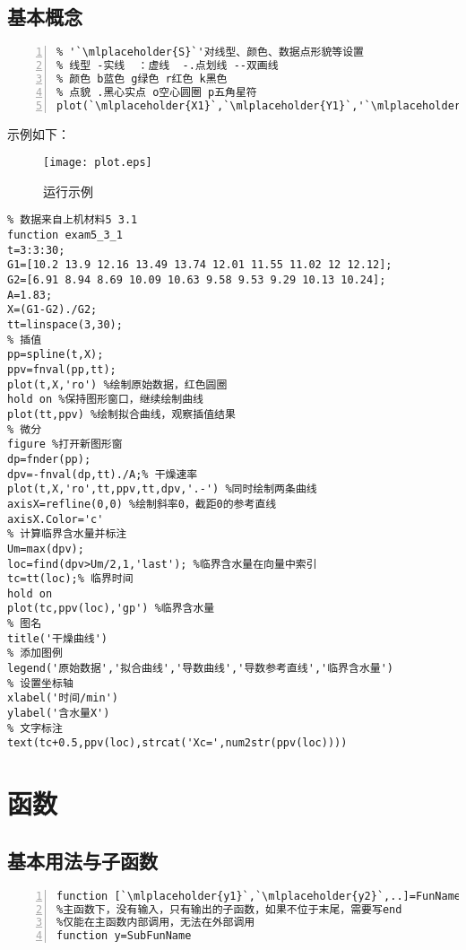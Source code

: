 \subsection{基本概念}
\begin{lstlisting}[frame=single,numbers=left]
% 可将多条曲线绘制于同一图形窗口
% '`\mlplaceholder{S}`'对线型、颜色、数据点形貌等设置
% 线型 -实线  ：虚线  -.点划线 --双画线
% 颜色 b蓝色 g绿色 r红色 k黑色
% 点貌 .黑心实点 o空心圆圈 p五角星符
plot(`\mlplaceholder{X1}`,`\mlplaceholder{Y1}`,'`\mlplaceholder{S1}`',`\mlplaceholder{X2}`,`\mlplaceholder{Y2}`,'`\mlplaceholder{S2}`',…）
\end{lstlisting}
示例如下：
\begin{figure}[htbp]
	\centering
	\texttt{[image: plot.eps]}
	\caption{运行示例}
\end{figure}
\newpage
\begin{lstlisting}
% 数据来自上机材料5 3.1
function exam5_3_1
t=3:3:30;
G1=[10.2 13.9 12.16 13.49 13.74 12.01 11.55 11.02 12 12.12];
G2=[6.91 8.94 8.69 10.09 10.63 9.58 9.53 9.29 10.13 10.24];
A=1.83;
X=(G1-G2)./G2;
tt=linspace(3,30);
% 插值
pp=spline(t,X);
ppv=fnval(pp,tt);
plot(t,X,'ro') %绘制原始数据，红色圆圈
hold on %保持图形窗口，继续绘制曲线
plot(tt,ppv) %绘制拟合曲线，观察插值结果
% 微分
figure %打开新图形窗
dp=fnder(pp);
dpv=-fnval(dp,tt)./A;% 干燥速率
plot(t,X,'ro',tt,ppv,tt,dpv,'.-') %同时绘制两条曲线
axisX=refline(0,0) %绘制斜率0，截距0的参考直线
axisX.Color='c'
% 计算临界含水量并标注
Um=max(dpv);
loc=find(dpv>Um/2,1,'last'); %临界含水量在向量中索引
tc=tt(loc);% 临界时间
hold on
plot(tc,ppv(loc),'gp') %临界含水量
% 图名
title('干燥曲线')
% 添加图例
legend('原始数据','拟合曲线','导数曲线','导数参考直线','临界含水量')
% 设置坐标轴
xlabel('时间/min')
ylabel('含水量X')
% 文字标注
text(tc+0.5,ppv(loc),strcat('Xc=',num2str(ppv(loc))))
\end{lstlisting}
\section{函数}
\subsection{基本用法与子函数}
\begin{lstlisting}[frame=single,numbers=left]
% 注意：[]与()的使用
function [`\mlplaceholder{y1}`,`\mlplaceholder{y2}`,..]=FunName(`\mlplaceholder{x1}`,`\mlplaceholder{x2}`,..)
%主函数下，没有输入，只有输出的子函数，如果不位于末尾，需要写end
%仅能在主函数内部调用，无法在外部调用
function y=SubFunName
\end{lstlisting}
